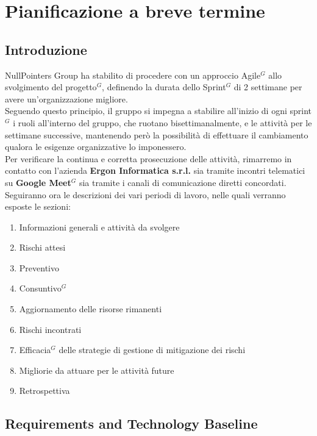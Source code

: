 \section{Pianificazione a breve termine}

\subsection{Introduzione}
NullPointers Group ha stabilito di procedere con un approccio Agile$^G$ allo svolgimento del progetto$^G$, definendo la durata dello Sprint$^G$ di 2 settimane per avere un'organizzazione migliore.\\
Seguendo questo principio, il gruppo si impegna a stabilire all’inizio di ogni sprint$^G$ i ruoli all'interno del gruppo, che ruotano bisettimanalmente, e le attività per le settimane successive, mantenendo però la possibilità di effettuare il cambiamento qualora le esigenze organizzative lo imponessero.\\
Per verificare la continua e corretta prosecuzione delle attività, rimarremo in contatto con l'azienda \textbf{Ergon Informatica s.r.l.} sia tramite incontri telematici su \textbf{Google Meet$^G$} sia tramite i canali di comunicazione diretti concordati.\\
Seguiranno ora le descrizioni dei vari periodi di lavoro, nelle quali verranno esposte le sezioni:
\begin{enumerate}
	\item Informazioni generali e attività da svolgere
	\item Rischi attesi
	\item Preventivo
	\item Consuntivo$^G$
	\item Aggiornamento delle risorse rimanenti
	\item Rischi incontrati
	\item Efficacia$^G$ delle strategie di gestione di mitigazione dei rischi
	\item Migliorie da attuare per le attività future
	\item Retrospettiva
\end{enumerate}

\newpage
\subsection{Requirements and Technology Baseline}



\newpage


